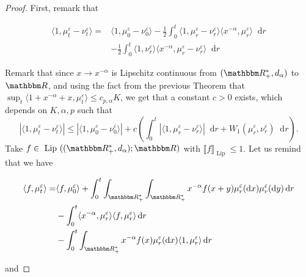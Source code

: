 \documentclass[a4paper,11pt, reqno]{amsart}
\newcommand{\eps}{\varepsilon}
\newcommand{\dd}{\mathop{}\!\mathrm{d}}
\newcommand{\1}{\mathbbm{1}}
\theoremstyle{plain}
\theoremstyle{definition}
\begin{document}
\begin{proof}
  First, remark that
  
  \begin{align*}
    \langle 1, \mu^{\eps}_t - \nu^{\eps}_t \rangle = & \langle
    1, \mu^{\eps}_0 - \nu^{\eps}_0 \rangle - \frac{1}{2}
    \int_0^t \langle 1, \mu^{\eps}_r - \nu^{\eps}_r \rangle
    \langle x^{- \alpha}, \mu^{\eps}_r \rangle \dd r\\
    & - \frac{1}{2} \int_0^t \langle 1, \nu^{\eps}_r \rangle \langle
    x^{- \alpha}, \mu^{\eps}_r - \nu^{\eps}_r \rangle \dd r
  \end{align*}
  
  Remark that since $x \rightarrow x^{- \alpha}$ is Lipschitz continuous from
  $(\RR_+^{\ast}, d_{\alpha})$ to $\RR$, and using the fact from
  the previous Theorem that $\sup_t \langle 1 + x^{- \alpha} + x,
  \mu^{\eps}_t \rangle \le c_{p, \alpha} K$, we get that a
  constant $c > 0$ exists, which depends on $K, \alpha, p$ such that
  \[ | \langle 1, \mu^{\eps}_t - \nu^{\eps}_t \rangle |
     \le | \langle 1, \mu^{\eps}_0 - \nu^{\eps}_0 \rangle
     | + c \left( \int_0^t | \langle 1, \mu^{\eps}_r -
     \nu^{\eps}_r \rangle | \dd r + W_1 (\mu_r^{\eps},
     \nu_r^{\eps}) \dd r \right) . \]
  Take $f \in  \text{ Lip } ((\RR_+^{\ast}, d_{\alpha}) ; \RR)$
  with $\llbracket f \rrbracket_{ \text{ Lip } } \le 1$. Let us remind that
  we have
  
  \begin{align*}
    \langle f, \mu^{\eps}_t \rangle = & \langle f, \mu^{\eps}_0
    \rangle + \int_0^t \int_{\RR^{\ast}_+} \int_{\RR^{\ast}_+}
    x^{- \alpha} f (x + y) \mu_r^{\eps} (\dd x) \mu_r^{\eps}
    (\dd y) \dd r\\
    & - \int_0^t \langle x^{- \alpha}, \mu^{\eps}_r \rangle \langle f,
    \mu_r^{\eps} \rangle \dd r\\
    & - \int_0^t \int_{\RR^{\ast}_+} x^{- \alpha} f (x)
    \mu_r^{\eps} (\dd x) \langle 1, \mu_r^{\eps} \rangle
    \dd r
  \end{align*}
  
  and
  

\end{proof}
\end{document}
